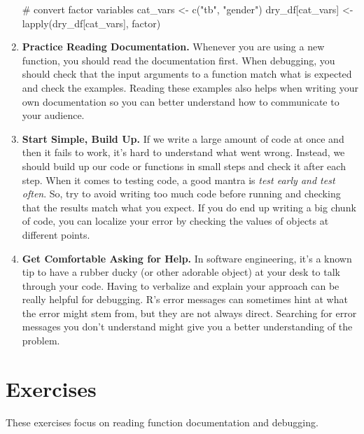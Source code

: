 \documentclass[
  letterpaper,
]{latex/krantz}
\makeatletter
\newenvironment{Shaded}{\begin{snugshade}}{\end{snugshade}}
\newcommand{\CommentTok}[1]{\textcolor[rgb]{0.37,0.37,0.37}{#1}}
\newcommand{\FunctionTok}[1]{\textcolor[rgb]{0.28,0.35,0.67}{#1}}
\newcommand{\NormalTok}[1]{\textcolor[rgb]{0.00,0.23,0.31}{#1}}
\newcommand{\OtherTok}[1]{\textcolor[rgb]{0.00,0.23,0.31}{#1}}
\newcommand{\StringTok}[1]{\textcolor[rgb]{0.13,0.47,0.30}{#1}}
\newenvironment{kframe}{%
\medskip{}
\setlength{\fboxsep}{.8em}
 \def\at@end@of@kframe{}%
 \ifinner\ifhmode%
  \def\at@end@of@kframe{\end{minipage}}%
  \begin{minipage}{\columnwidth}%
 \fi\fi%
 \def\FrameCommand##1{\hskip\@totalleftmargin \hskip-\fboxsep
 \colorbox{shadecolor}{##1}\hskip-\fboxsep
     \hskip-\linewidth \hskip-\@totalleftmargin \hskip\columnwidth}%
 \MakeFramed {\advance\hsize-\width
   \@totalleftmargin\z@ \linewidth\hsize
   \@setminipage}}%
 {\par\unskip\endMakeFramed%
 \at@end@of@kframe}
\renewenvironment{Shaded}{\begin{kframe}}{\end{kframe}}
\makeatother
\begin{document}
\begin{enumerate}
\begin{Shaded}
\begin{Highlighting}[]
\CommentTok{\# convert factor variables}
\NormalTok{cat\_vars }\OtherTok{\textless{}{-}} \FunctionTok{c}\NormalTok{(}\StringTok{"tb"}\NormalTok{, }\StringTok{"gender"}\NormalTok{)}
\NormalTok{dry\_df[cat\_vars] }\OtherTok{\textless{}{-}} \FunctionTok{lapply}\NormalTok{(dry\_df[cat\_vars], factor)}
\end{Highlighting}
\end{Shaded}
\item
  \textbf{Practice Reading Documentation.} Whenever you are using a new
  function, you should read the documentation first. When debugging, you
  should check that the input arguments to a function match what is
  expected and check the examples. Reading these examples also helps
  when writing your own documentation so you can better understand how
  to communicate to your audience.
\item
  \textbf{Start Simple, Build Up.} If we write a large amount of code at
  once and then it fails to work, it's hard to understand what went
  wrong. Instead, we should build up our code or functions in small
  steps and check it after each step. When it comes to testing code, a
  good mantra is \emph{test early and test often}. So, try to avoid
  writing too much code before running and checking that the results
  match what you expect. If you do end up writing a big chunk of code,
  you can localize your error by checking the values of objects at
  different points.
\item
  \textbf{Get Comfortable Asking for Help.} In software engineering,
  it's a known tip to have a rubber ducky (or other adorable object) at
  your desk to talk through your code. Having to verbalize and explain
  your approach can be really helpful for debugging. R's error messages
  can sometimes hint at what the error might stem from, but they are not
  always direct. Searching for error messages you don't understand might
  give you a better understanding of the problem.
\end{enumerate}

\section{Exercises}\label{exercises-14}

These exercises focus on reading function documentation and debugging.
\end{document}
